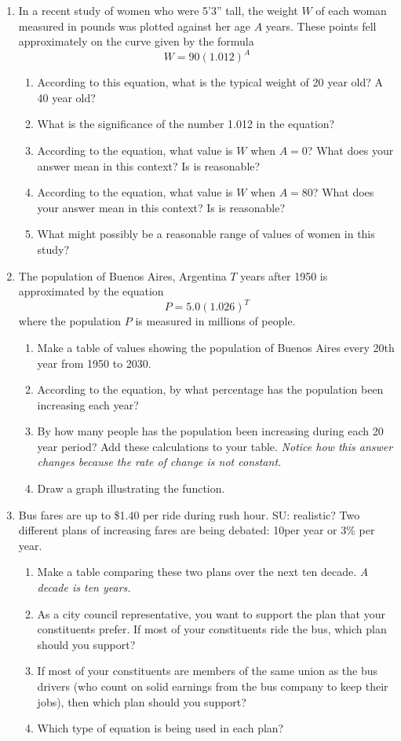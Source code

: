 \begin{enumerate}
\item In a recent study of women who were 5'3'' tall, the weight $W$ of each woman measured in pounds was plotted against her age $A$ years.  These points fell approximately on the curve given by the formula $$W = 90(1.012)^A$$ 
\begin{enumerate}
\item According to this equation, what is the typical weight of 20 year old?  A 40 year old?
\item What is the significance of the number 1.012 in the equation?
\item According to the equation, what value is $W$ when $A =0$?  What does your answer mean in this context?  Is is reasonable?
\item According to the equation, what value is $W$ when $A =80$?  What does your answer mean in this context?  Is is reasonable?
\item What might possibly be a reasonable range of values of women in this study?
\end{enumerate}

\item The population of Buenos Aires, Argentina $T$ years after 1950 is approximated by the equation $$P=5.0(1.026)^T$$ where the population $P$ is measured in millions of people.
\begin{enumerate}
\item Make a table of values showing the population of Buenos Aires every 20th year from 1950 to 2030.
\item According to the equation, by what percentage has the population been increasing each year?
\item By how many people has the population been increasing during each 20 year period? Add these calculations to your table. \emph{Notice how this answer changes because the rate of change is not constant.}
\item Draw a graph illustrating the function.
\end{enumerate}

\item Bus fares are up to \$1.40 per ride during rush hour.  SU: realistic?  Two different plans of increasing fares are being debated: 10\textcent per year or 3\% per year.
\begin{enumerate}
\item Make a table comparing these two plans over the next ten decade.  \emph{A decade is ten years.}
\item As a city council representative, you want to support the plan that your constituents prefer.  If most of your constituents ride the bus, which plan should you support?
\item If most of your constituents are members of the same union as the bus drivers (who count on solid earnings from the bus company to keep their jobs), then which plan should you support?
\item Which type of equation is being used in each plan?
\end{enumerate}



\end{enumerate}
